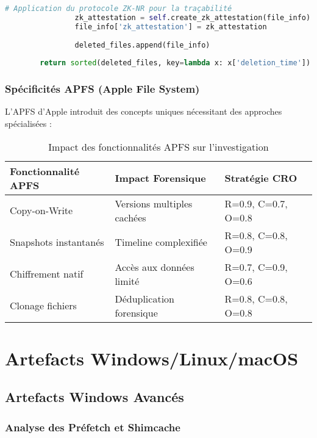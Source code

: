 \begin{lstlisting}[language=Python, caption=Analyseur EXT4 avec reconstruction temporelle]
                # Application du protocole ZK-NR pour la traçabilité
                zk_attestation = self.create_zk_attestation(file_info)
                file_info['zk_attestation'] = zk_attestation
                
                deleted_files.append(file_info)
                
        return sorted(deleted_files, key=lambda x: x['deletion_time'])
\end{lstlisting}

\subsubsection{Spécificités APFS (Apple File System)}

L'APFS d'Apple introduit des concepts uniques nécessitant des approches spécialisées :

\begin{table}[h]
\centering
\begin{tabular}{|l|l|l|}
\hline
\textbf{Fonctionnalité APFS} & \textbf{Impact Forensique} & \textbf{Stratégie CRO} \\
\hline
Copy-on-Write & Versions multiples cachées & R=0.9, C=0.7, O=0.8 \\
Snapshots instantanés & Timeline complexifiée & R=0.8, C=0.8, O=0.9 \\
Chiffrement natif & Accès aux données limité & R=0.7, C=0.9, O=0.6 \\
Clonage fichiers & Déduplication forensique & R=0.8, C=0.8, O=0.8 \\
\hline
\end{tabular}
\caption{Impact des fonctionnalités APFS sur l'investigation}
\end{table}

\section{Artefacts Windows/Linux/macOS}

\subsection{Artefacts Windows Avancés}

\subsubsection{Analyse des Préfetch et Shimcache}

